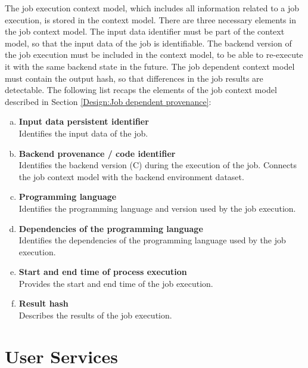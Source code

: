 \documentclass[draft,final]{vutinfth} %
\begin{document}
The job execution context model, which includes all information related to a job execution, is stored in the context model. There are three necessary elements in the job context model. The input data identifier must be part of the context model, so that the input data of the job is identifiable. The backend version of the job execution must be included in the context model, to be able to re-execute it with the same backend state in the future. The job dependent context model must contain the output hash, so that differences in the job results are detectable. The following list recaps the elements of the job context model described in Section \ref{Design:Job dependent provenance}: 

\begin{enumerate}[(a)]
	\item \textbf{Input data persistent identifier} \\
	Identifies the input data of the job.
	\item \textbf{Backend provenance / code identifier} \\
	Identifies the backend version (C) during the execution of the job. Connects the job context model with the backend environment dataset.
	\item \textbf{Programming language} \\
	Identifies the programming language and version used by the job execution.
	\item \textbf{Dependencies of the programming language} \\
	Identifies the dependencies of the programming language used by the job execution.
	\item \textbf{Start and end time of process execution} \\
	Provides the start and end time of the job execution.
	\item \textbf{Result hash} \\
	Describes the results of the job execution.
\end{enumerate}

\section{User Services}\label{Design:User Interface}
\end{document}
